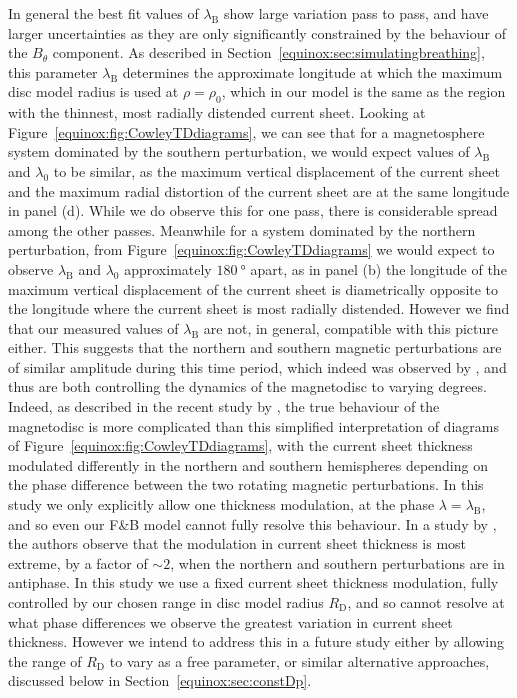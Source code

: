 In general the best fit values of $\lambda_\mathrm{B}$ show large variation pass to pass, and have larger uncertainties as they are only significantly constrained by the behaviour of the $B_{\theta}$ component. As described in Section~\ref{equinox:sec:simulatingbreathing}, this parameter $\lambda_\mathrm{B}$ determines the approximate longitude at which the maximum disc model radius is used at $\rho = \rho_0$, which in our model is the same as the region with the thinnest, most radially distended current sheet. Looking at Figure~\ref{equinox:fig:CowleyTDdiagrams}, we can see that for a magnetosphere system dominated by the southern perturbation, we would expect values of $\lambda_\mathrm{B}$ and $\lambda_\mathrm{0}$ to be similar, as the maximum vertical displacement of the current sheet and the maximum radial distortion of the current sheet are at the same longitude in panel (d). While we do observe this for one pass, there is considerable spread among the other passes. Meanwhile for a system dominated by the northern perturbation, from Figure~\ref{equinox:fig:CowleyTDdiagrams} we would expect to observe $\lambda_\mathrm{B}$ and $\lambda_\mathrm{0}$ approximately $\SI{180}{\degree}$ apart, as in panel (b) the longitude of the maximum vertical displacement of the current sheet is diametrically opposite to the longitude where the current sheet is most radially distended. However we find that our measured values of $\lambda_\mathrm{B}$ are not, in general, compatible with this picture either. This suggests that the northern and southern magnetic perturbations are of similar amplitude during this time period, which indeed was observed by \citet{andrews2012}, and thus are both controlling the dynamics of the magnetodisc to varying degrees. Indeed, as described in the recent study by \citet{cowley2017b}, the true behaviour of the magnetodisc is more complicated than this simplified interpretation of diagrams of Figure~\ref{equinox:fig:CowleyTDdiagrams}, with the current sheet thickness modulated differently in the northern and southern hemispheres depending on the phase difference between the two rotating magnetic perturbations. In this study we only explicitly allow one thickness modulation, at the phase $\lambda = \lambda_\mathrm{B}$, and so even our F{\&}B model cannot fully resolve this behaviour. In a study by \citep{provan2012}, the authors observe that the modulation in current sheet thickness is most extreme, by a factor of ${\sim}2$, when the northern and southern perturbations are in antiphase. In this study we use a fixed current sheet thickness modulation, fully controlled by our chosen range in disc model radius $R_\mathrm{D}$, and so cannot resolve at what phase differences we observe the greatest variation in current sheet thickness. However we intend to address this in a future study either by allowing the range of $R_\mathrm{D}$ to vary as a free parameter, or similar alternative approaches, discussed below in Section~\ref{equinox:sec:constDp}.

